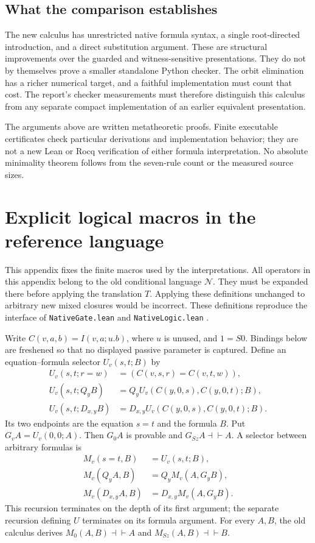 \documentclass[11pt,a4paper]{article}
\theoremstyle{definition}
\newcommand{\eqv}{\dashv\vdash}
\begin{document}
\subsection{What the comparison establishes}

The new calculus has unrestricted native formula syntax, a single
root-directed introduction, and a direct substitution argument.  These
are structural improvements over the guarded and witness-sensitive
presentations.  They do not by themselves prove a smaller standalone
Python checker.  The orbit elimination has a richer numerical target,
and a faithful implementation must count that cost.  The report's
checker measurements must therefore distinguish this calculus from any
separate compact implementation of an earlier equivalent presentation.

The arguments above are written metatheoretic proofs.  Finite executable
certificates check particular derivations and implementation behavior;
they are not a new Lean or Rocq verification of either formula
interpretation.  No absolute minimality theorem follows from the
seven-rule count or the measured source sizes.


\appendix
\section{Explicit logical macros in the reference language}
\label{app:old-macros}

This appendix fixes the finite macros used by the interpretations. All
operators in this appendix belong to the old conditional language
$\mathcal N$. They must be expanded there before applying the translation
$T$. Applying these definitions unchanged to arbitrary new mixed
closures would be incorrect. These definitions reproduce the interface
of \texttt{NativeGate.lean} and \texttt{NativeLogic.lean}
\cite{native}.

Write $C(v,a,b)=I(v,a;u.b)$, where $u$ is unused, and $1=S0$.
Bindings below are freshened so that no displayed passive parameter is
captured. Define an equation--formula selector $U_v(s,t;B)$ by
\[
\begin{aligned}
U_v(s,t;r=w)&=(C(v,s,r)=C(v,t,w)),\\
U_v(s,t;Q_y B)&=Q_y U_v(C(y,0,s),C(y,0,t);B),\\
U_v(s,t;D_{x,y} B)&=D_{x,y}U_v(C(y,0,s),C(y,0,t);B).
\end{aligned}
\]
Its two endpoints are the equation $s=t$ and the formula $B$.
Put $G_v A=U_v(0,0;A)$. Then $G_0 A$ is provable and
$G_{Sz}A\eqv A$. A selector between arbitrary formulas is
\[
\begin{aligned}
M_v(s=t,B)&=U_v(s,t;B),\\
M_v(Q_y A,B)&=Q_y M_v(A,G_yB),\\
M_v(D_{x,y} A,B)&=D_{x,y}M_v(A,G_yB).
\end{aligned}
\]
This recursion terminates on the depth of its first argument; the
separate recursion defining $U$ terminates on its formula argument.
For every $A,B$, the old calculus derives
$M_0(A,B)\eqv A$ and $M_{Sz}(A,B)\eqv B$.
\end{document}
